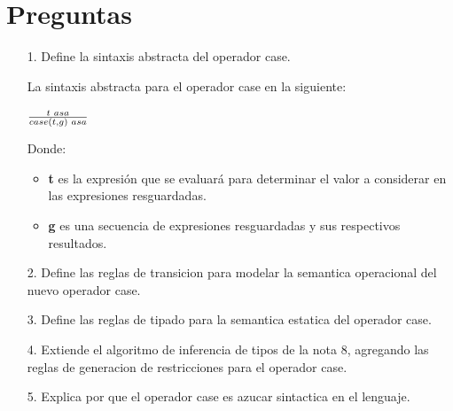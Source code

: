 \documentclass{article}
\begin{document}
    \section{Preguntas}
    \begin{itemize}
        \item[1.] Define la sintaxis abstracta del operador case.
        
        La sintaxis abstracta para el operador {\sf case} en la siguiente:
        \begin{center}
                \Large{$\frac{t\hspace{0.1cm}asa}{case(t,g)\hspace{0.1cm}asa}$}
            \end{center}
        Donde:
        \begin{itemize}
            \item \textbf{t} es la expresión que se evaluará para determinar el valor a considerar en las expresiones resguardadas.

            \item \textbf{g} es una secuencia de expresiones resguardadas y sus respectivos resultados.\\
        \end{itemize}
        
        \item[2.] Define las reglas de transicion para modelar la semantica operacional del nuevo operador case.
        \item[3.] Define las reglas de tipado para la semantica estatica del operador case.
        \item[4.] Extiende el algoritmo de inferencia de tipos de la nota 8, agregando las reglas de generacion de restricciones para el operador case.
        \item[5.] Explica por que el operador case es azucar sintactica en el lenguaje.
    \end{itemize}
\end{document}
